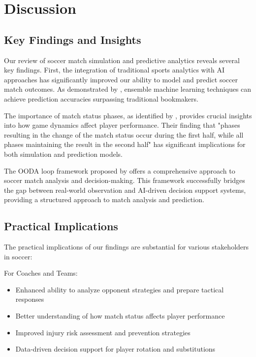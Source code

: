 \documentclass[10pt,journal,compsoc]{IEEEtran}
\begin{document}
\section{Discussion}

\subsection{Key Findings and Insights}
Our review of soccer match simulation and predictive analytics reveals several key findings. First, the integration of traditional sports analytics with AI approaches has significantly improved our ability to model and predict soccer match outcomes. As demonstrated by \cite{wong2025predictive}, ensemble machine learning techniques can achieve prediction accuracies surpassing traditional bookmakers.

The importance of match status phases, as identified by \cite{konefal2023seven}, provides crucial insights into how game dynamics affect player performance. Their finding that "phases resulting in the change of the match status occur during the first half, while all phases maintaining the result in the second half" has significant implications for both simulation and prediction models.

The OODA loop framework proposed by \cite{pu2024orientation} offers a comprehensive approach to soccer match analysis and decision-making. This framework successfully bridges the gap between real-world observation and AI-driven decision support systems, providing a structured approach to match analysis and prediction.

\subsection{Practical Implications}
The practical implications of our findings are substantial for various stakeholders in soccer:

For Coaches and Teams:
\begin{itemize}
    \item Enhanced ability to analyze opponent strategies and prepare tactical responses
    \item Better understanding of how match status affects player performance
    \item Improved injury risk assessment and prevention strategies
    \item Data-driven decision support for player rotation and substitutions
\end{itemize}
\end{document}
